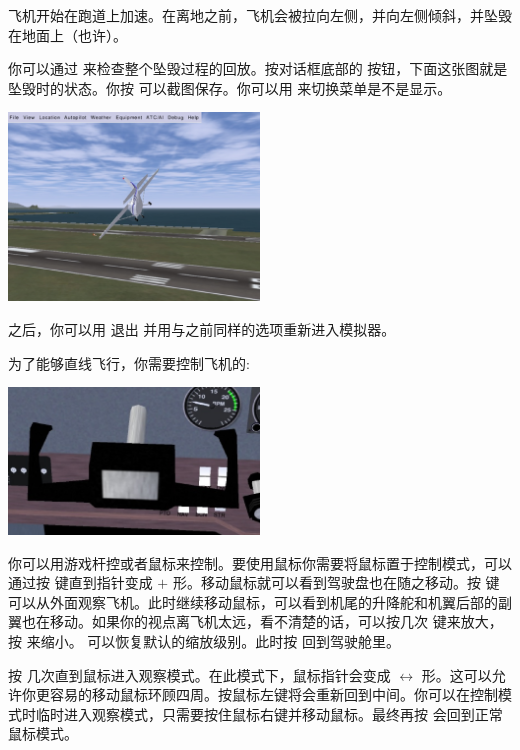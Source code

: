 飞机开始在跑道上加速。在离地之前，飞机会被拉向左侧，并向左侧倾斜，并坠毁在地面上（也许）。


你可以通过  来检查整个坠毁过程的回放。按对话框底部的  按钮，下面这张图就是坠毁时的状态。你按  可以截图保存。你可以用  来切换菜单是不是显示。

\begin{center}
\includegraphics[width=0.5\textwidth]{img/tut_9}
\end{center}

之后，你可以用  退出 \FlightGear{} 并用与之前同样的选项重新进入模拟器。

为了能够直线飞行，你需要控制飞机的:

\begin{center}
\includegraphics[width=0.5\textwidth]{img/tut_10}
\end{center}

你可以用游戏杆控或者鼠标来控制。要使用鼠标你需要将鼠标置于控制模式，可以通过按  键直到指针变成 $+$ 形。移动鼠标就可以看到驾驶盘也在随之移动。按  键可以从外面观察飞机。此时继续移动鼠标，可以看到机尾的升降舵和机翼后部的副翼也在移动。如果你的视点离飞机太远，看不清楚的话，可以按几次  键来放大，按  来缩小。 可以恢复默认的缩放级别。此时按  回到驾驶舱里。

按  几次直到鼠标进入观察模式。在此模式下，鼠标指针会变成 $\leftrightarrow$ 形。这可以允许你更容易的移动鼠标环顾四周。按鼠标左键将会重新回到中间。你可以在控制模式时临时进入观察模式，只需要按住鼠标右键并移动鼠标。最终再按  会回到正常鼠标模式。

